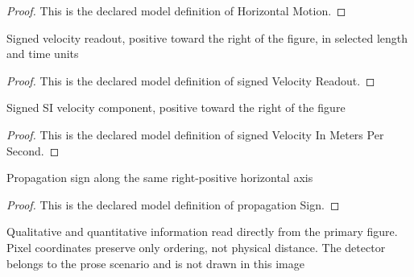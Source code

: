 \begin{proof}
  This is the declared model definition of Horizontal Motion.
\end{proof}
\begin{definition}
  \label{def:physics:phyx-mini-0214:phyxminiproblems-problemphyxmini0214-signedvelocityreadout}
  Signed velocity readout, positive toward the right of the figure, in selected length and time units
\end{definition}
\begin{proof}
  This is the declared model definition of signed Velocity Readout.
\end{proof}
\begin{definition}
  \label{def:physics:phyx-mini-0214:phyxminiproblems-problemphyxmini0214-signedvelocityinmeterspersecond}
  Signed SI velocity component, positive toward the right of the figure
\end{definition}
\begin{proof}
  This is the declared model definition of signed Velocity In Meters Per Second.
\end{proof}
\begin{definition}
  \label{def:physics:phyx-mini-0214:phyxminiproblems-problemphyxmini0214-propagationsign}
  Propagation sign along the same right-positive horizontal axis
\end{definition}
\begin{proof}
  This is the declared model definition of propagation Sign.
\end{proof}
\begin{definition}
  \label{def:physics:phyx-mini-0214:phyxminiproblems-problemphyxmini0214-movingreflectorfigure}
  Qualitative and quantitative information read directly from the primary figure. Pixel coordinates preserve only ordering, not physical distance. The detector belongs to the prose scenario and is not drawn in this image
\end{definition}
